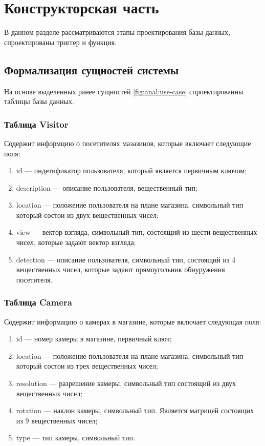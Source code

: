 \section{Конструкторская часть}

В данном разделе рассматриваются этапы проектирования базы данных, спроектированы триггер и функция.

\subsection{Формализация сущностей системы}

На основе выделенных ранее сущностей \ref{fig:anal:use-case} спроектированны таблицы 
базы данных.

\subsubsection{Таблица Visitor}

Содержит информцию о посетителях мазазинов, которые включает следующие поля:

\begin{enumerate}[label=\arabic*.]
    \item id --- индетификатор пользователя, который является первичным ключом;
    \item description --- описание пользователя, вещественный тип;
    \item location --- положение пользователя на плане магазина, символьный тип 
    который состои из двух вещественных чисел;
    \item view --- вектор взгляда, символьный тип, состоящий из шести вещественных
    чисел, которые задают вектор взгляда;
    \item detection --- описание пользователя, символьный тип, 
    состоящий из 4 вещественных
    чисел, которые задают прямоугольник обнуружения посетителя.
\end{enumerate}

\subsubsection{Таблица Camera}

Содержит информацию о камерах в магазине, которые включает следующая поля:

\begin{enumerate}[label=\arabic*.]
    \item id --- номер камеры в магазине, первичный ключ;
    \item location --- положение пользователя на плане магазина, символьный тип 
    который состои из трех вещественных чисел;
    \item resolution --- разрешение камеры, символьный тип состоящий из двух
    вещественных чисел;
    \item rotation --- наклон камеры, символьный тип. Является матрицей
    состоящих из 9 вещественных чисел;
    \item type --- тип камеры, символьный тип.
\end{enumerate}

